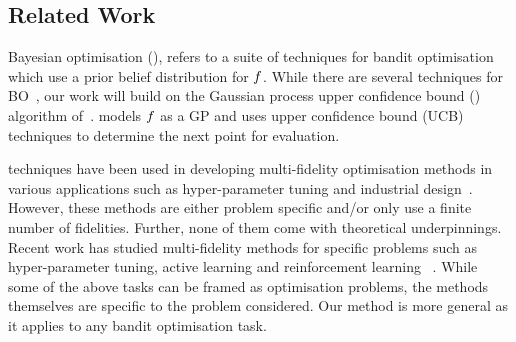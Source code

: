 \vspace{-0.07in}
\subsection*{Related Work}
\vspace{-0.07in}

Bayesian optimisation (\bayo), refers to a suite of techniques for bandit optimisation
which use a prior belief distribution for $f$.
While there are several techniques for
BO~\citep{mockus94bo,jones98expensive,thompson33sampling,lobato14pes},
our work will build on the 
Gaussian process upper confidence bound (\gpucb) algorithm
of~\citet{srinivas10gpbandits}.
\gpucbs models $f$ as a GP and uses upper confidence bound (UCB)~\citep{auer03ucb}
techniques to determine the next point for evaluation.

\bayo{} techniques have been used in developing multi-fidelity optimisation methods
in various applications such as hyper-parameter tuning and industrial
design~\citep{huang06mfKriging,swersky2013multi,klein2015towards,forrester07cokriging,%
poloczek2016multi}.
However, these methods are either problem specific and/or only use a finite
number of fidelities.
Further, none of them come with theoretical underpinnings.
Recent work has studied multi-fidelity methods for specific problems 
such as hyper-parameter tuning, active learning and
reinforcement learning%
~\citep{agarwal2011oracle,sabharwal2015selecting,cutler14mfsim,zhang15weakAndStrong,%
li2016hyperband}.
While some of the above tasks can be framed as optimisation problems, the methods
themselves are specific to the problem considered.
Our method is more general as it applies to any bandit optimisation task.


